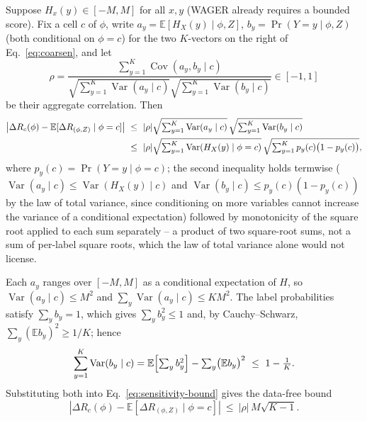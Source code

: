 \begin{proposition}\label{prop:sensitivity}
Suppose $H_x(y)\in[-M,M]$ for all $x,y$ (WAGER already requires a bounded score). Fix a
cell $c$ of $\phi$, write $a_y=\mathbb E[H_X(y)\mid\phi,Z]$, $b_y=\Pr(Y=y\mid\phi,Z)$
(both conditional on $\phi=c$) for the two $K$-vectors on the right of
Eq.~\eqref{eq:coarsen}, and let
\begin{equation}
\rho=\frac{\sum_{y=1}^K\operatorname{Cov}(a_y,b_y\mid c)}
{\sqrt{\sum_{y=1}^K\operatorname{Var}(a_y\mid c)}\sqrt{\sum_{y=1}^K\operatorname{Var}(b_y\mid c)}}
\in[-1,1]
\end{equation}
be their aggregate correlation. Then
\begin{align}
\left|\Delta R_c(\phi)-\mathbb E[\Delta R_{(\phi,Z)}\mid\phi=c]\right|
&\ \le\ |\rho|\sqrt{\textstyle\sum_{y=1}^K\operatorname{Var}(a_y\mid c)}\,
\sqrt{\textstyle\sum_{y=1}^K\operatorname{Var}(b_y\mid c)}\notag\\
&\ \le\ |\rho|\sqrt{\textstyle\sum_{y=1}^K\operatorname{Var}(H_X(y)\mid\phi=c)}\,
\sqrt{\textstyle\sum_{y=1}^Kp_y(c)\bigl(1-p_y(c)\bigr)},
\label{eq:sensitivity-bound}
\end{align}
where $p_y(c)=\Pr(Y=y\mid\phi=c)$; the second inequality holds termwise
($\operatorname{Var}(a_y\mid c)\le\operatorname{Var}(H_X(y)\mid c)$ and
$\operatorname{Var}(b_y\mid c)\le p_y(c)(1-p_y(c))$ by the law of total variance, since
conditioning on more variables cannot increase the variance of a conditional
expectation) followed by monotonicity of the square root applied to each sum
separately -- a product of two square-root sums, not a sum of per-label square roots,
which the law of total variance alone would not license.
\end{proposition}

\begin{corollary}\label{cor:sensitivity-crude}
Each $a_y$ ranges over $[-M,M]$ as a conditional expectation of $H$, so
$\operatorname{Var}(a_y\mid c)\le M^2$ and $\sum_y\operatorname{Var}(a_y\mid c)\le KM^2$.
The label probabilities satisfy $\sum_yb_y=1$, which gives $\sum_yb_y^2\le1$ and, by
Cauchy--Schwarz, $\sum_y(\mathbb E b_y)^2\ge1/K$; hence
\begin{equation}
\sum_{y=1}^K\operatorname{Var}(b_y\mid c)
=\mathbb E\Bigl[\textstyle\sum_yb_y^2\Bigr]-\sum_y\bigl(\mathbb E b_y\bigr)^2
\ \le\ 1-\frac1K .
\label{eq:simplex-var}
\end{equation}
Substituting both into Eq.~\eqref{eq:sensitivity-bound} gives the data-free bound
\begin{equation}
\left|\Delta R_c(\phi)-\mathbb E[\Delta R_{(\phi,Z)}\mid\phi=c]\right|
\ \le\ |\rho|\,M\sqrt{K-1}.
\label{eq:sensitivity-crude}
\end{equation}
\end{corollary}

